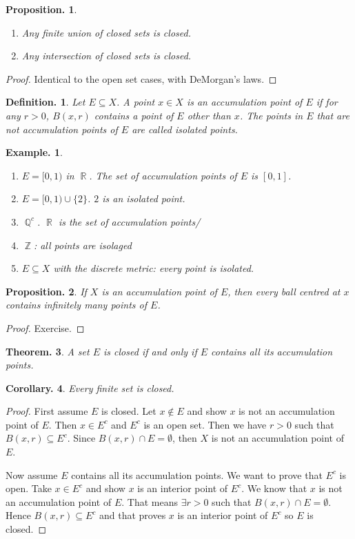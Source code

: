 \documentclass[11pt, a4paper]{memoir}
\DeclareMathOperator{\Q}{{\mathbb{Q}}}
\DeclareMathOperator{\Z}{{\mathbb{Z}}}
\DeclareMathOperator{\R}{{\mathbb{R}}}
\theoremstyle{change}
\newtheorem{theorem}{Theorem.}[section]
\newtheorem{corollary}[theorem]{Corollary.}
\newtheorem{proposition}[theorem]{Proposition.}
\theoremstyle{plain}
\theoremstyle{nonumberplain}
\newtheorem{definition}{Definition.}
\newtheorem{example}{Example.}
\newtheorem{proof}{Proof}
\numberwithin{equation}{section}
\begin{document}
\begin{proposition} \hspace{1cm}
    \begin{enumerate}
        \item Any finite union of closed sets is closed.
        \item Any intersection of closed sets is closed.
    \end{enumerate}
\end{proposition}
\begin{proof}
    Identical to the open set cases, with DeMorgan's laws.
\end{proof}
\begin{definition}
    Let $E\subseteq X$. A point $x\in X$ is an \textit{accumulation point} of $E$ if for any $r>0$, $B(x,r)$ contains a point
    of $E$ other than $x$. The points in $E$ that are not accumulation points of $E$ are called \textit{isolated points}.
\end{definition}
\begin{example}
    \begin{enumerate}
        \item $E=[0,1)$ in $\R$. The set of accumulation points of $E$ is $[0,1]$.
        \item $E=[0,1)\cup\{2\}$. $2$ is an isolated point.
        \item $\Q^c$. $\R$ is the set of accumulation points/
        \item $\Z$: all points are isolaged
        \item $E\subseteq X$ with the discrete metric: every point is isolated.
    \end{enumerate}
\end{example}
\begin{proposition}
    If $X$ is an accumulation point of $E$, then every ball centred at $x$ contains infinitely many points of $E$.
\end{proposition}
\begin{proof}
    Exercise.
\end{proof}
\begin{theorem}
    A set $E$ is closed if and only if $E$ contains all its accumulation points.
\end{theorem}
\begin{corollary}
    Every finite set is closed.
\end{corollary}
\begin{proof}
    First assume $E$ is closed. Let $x\notin E$ and show $x$ is not an accumulation point of $E$. Then $x\in E^c$ and
    $E^c$ is an open set. Then we have $r>0$ such that $B(x,r)\subseteq E^c$. Since $B(x,r)\cap E=\emptyset$, then $X$
    is not an accumulation point of $E$.

    Now assume $E$ contains all its accumulation points. We want to prove that $E^c$ is open. Take $x\in E^c$ and show
    $x$ is an interior point of $E^c$. We know that $x$ is not an accumulation point of $E$. That means $\exists r>0$ such that
    $B(x,r)\cap E=\emptyset$. Hence $B(x,r)\subseteq E^c$ and that proves $x$ is an interior point of $E^c$ so $E$ is closed.
\end{proof}
\end{document}
